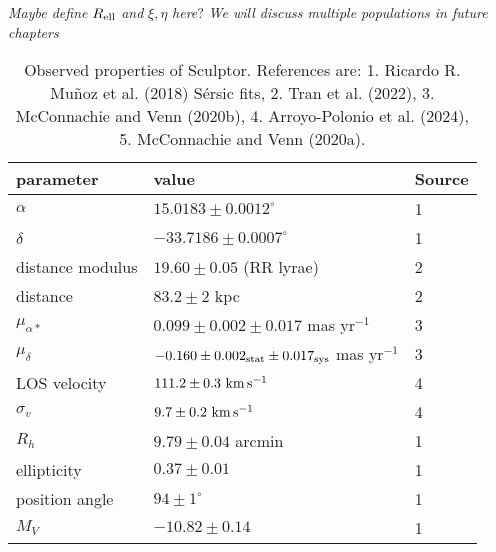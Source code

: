 \emph{Maybe define \(R_{\rm ell}\)} \emph{and} \(\xi, \eta\)
\emph{here}? \emph{We will discuss multiple populations in future
chapters}

\begin{table*}[t]
\centering
\caption[Observed Properties of Sculptor]{Observed properties of Sculptor. References are: 1. Ricardo R. Muñoz et al. (2018) Sérsic fits, 2. Tran et al. (2022), 3. McConnachie and Venn (2020b), 4. Arroyo-Polonio et al. (2024), 5. McConnachie and Venn (2020a). }
\label{tbl:scl_obs_props}
\begin{tabular}{lll}
\toprule
parameter & value & Source\\
\midrule
$\alpha$ & $15.0183 \pm 0.0012^\circ$ & 1\\
$\delta$ & $-33.7186 \pm 0.0007^\circ$ & 1\\
distance modulus & $19.60 \pm 0.05$ (RR lyrae) & 2\\
distance & $83.2 \pm 2$ kpc & 2\\
$\mu_{\alpha*}$ & $0.099 \pm 0.002 \pm 0.017$ mas yr$^{-1}$ & 3\\
$\mu_\delta$ & $-0.160 \pm 0.002_{\rm stat} \pm 0.017_{\rm sys}$ mas yr$^{-1}$ & 3\\
LOS velocity & $111.2 \pm 0.3\ {\rm km\,s^{-1}}$ & 4\\
$\sigma_v$ & $9.7\pm0.2\ {\rm km\,s^{-1}}$ & 4\\
$R_h$ & $9.79 \pm 0.04$ arcmin & 1\\
ellipticity & $0.37 \pm 0.01$ & 1\\
position angle & $94\pm1^\circ$ & 1\\
$M_V$ & $-10.82\pm0.14$ & 1\\
\bottomrule
\end{tabular}
\end{table*}

